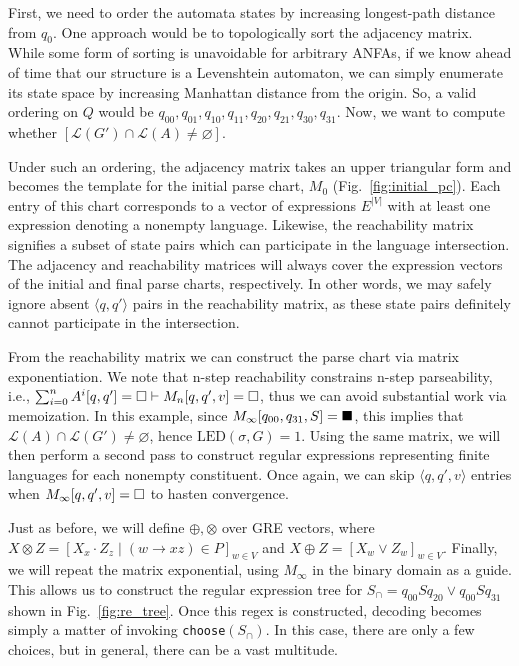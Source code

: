 \documentclass[sigplan,acmsmall,nonacm,screen]{acmart}\settopmatter{printfolios=false,printccs=false,printacmref=false}
\begin{document}
First, we need to order the automata states by increasing longest-path distance from $q_0$. One approach would be to topologically sort the adjacency matrix. While some form of sorting is unavoidable for arbitrary ANFAs, if we know ahead of time that our structure is a Levenshtein automaton, we can simply enumerate its state space by increasing Manhattan distance from the origin. %
So, a valid ordering on $Q$ would be $q_{00}, q_{01}, q_{10}, q_{11}, q_{20}, q_{21}, q_{30}, q_{31}$. Now, we want to compute whether $[\mathcal{L}(G')\cap \mathcal{L}(A) \neq \varnothing]$.

Under such an ordering, the adjacency matrix takes an upper triangular form and becomes the template for the initial parse chart, $M_0$ (Fig.~\ref{fig:initial_pc}). Each entry of this chart corresponds to a vector of expressions $E^{|V|}$ with at least one expression denoting a nonempty language. Likewise, the reachability matrix signifies a subset of state pairs which can participate in the language intersection. The adjacency and reachability matrices will always cover the expression vectors of the initial and final parse charts, respectively. In other words, we may safely ignore absent $\langle q, q'\rangle$ pairs in the reachability matrix, as these state pairs definitely cannot participate in the intersection.

From the reachability matrix we can construct the parse chart via matrix exponentiation. We note that n-step reachability constrains n-step parseability, i.e., $\sum_{i=0}^n A^i[q, q'] = \square \vdash M_n[q, q', v] = \square$, thus we can avoid substantial work via memoization. In this example, since $M_\infty[q_{00}, q_{31}, S] = \blacksquare$, this implies that $\mathcal{L}(A)\cap \mathcal{L}(G') \neq \varnothing$, hence $\text{LED}(\sigma, G) = 1$. Using the same matrix, we will then perform a second pass to construct regular expressions representing finite languages for each nonempty constituent. Once again, we can skip $\langle q, q', v\rangle$ entries when $M_\infty[q, q', v] = \square$ to hasten convergence.

\enlargethispage{4\baselineskip}
Just as before, we will define $\oplus, \otimes$ over GRE vectors, where $X \otimes Z = [X_x\cdot Z_z \mid (w\rightarrow xz) \in P]_{w\in V}$ and $X \oplus Z= [ X_w\vee Z_w ]_{w\in V}$. Finally, we will repeat the matrix exponential, using $M_\infty$ in the binary domain as a guide. This allows us to construct the regular expression tree for $S_\cap = q_{00}Sq_{20}\vee q_{00}Sq_{31}$ shown in Fig.~\ref{fig:re_tree}. Once this regex is constructed, decoding becomes simply a matter of invoking \texttt{choose}$(S_\cap)$. In this case, there are only a few choices, but in general, there can be a vast multitude.
\end{document}
